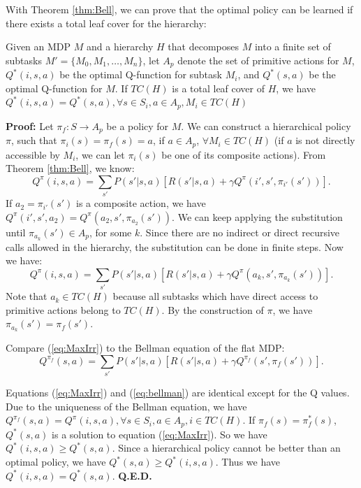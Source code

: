 With Theorem \ref{thm:Bell}, we can prove that the optimal policy can be learned if there exists a 
total leaf cover for the hierarchy:
\begin{theorem}
    Given an MDP $M$ and a hierarchy $H$ that decomposes $M$ into a finite set of subtasks $M' = \{M_0, M_1, \dots, M_n\}$,
    let $A_p$ denote the set of primitive actions for $M$, $Q^*(i, s, a)$ be the optimal Q-function for subtask $M_i$, and
    $Q^*(s, a)$ be the optimal Q-function for $M$. If $TC(H)$ is a total leaf cover of $H$,
    we have $Q^*(i, s, a) = Q^*(s, a), \forall s \in S_i, a \in A_p, M_i \in TC(H)$
    \label{thm:opt}
\end{theorem}
\textbf{Proof:} 
    Let $\pi_f: S \rightarrow A_p$ be a policy for $M$. We can construct a hierarchical policy $\pi$, such that
    $\pi_i(s) = \pi_f(s) = a$, if $a \in A_p$, $\forall M_i \in TC(H)$ (if $a$ is not directly accessible by $M_i$, we can
    let $\pi_i(s)$ be one of its composite actions).
    From Theorem \ref{thm:Bell}, we know: 
    \begin{equation}
        Q^{\pi}(i, s, a) = \sum_{s'}P(s'|s, a)[R(s'|s, a) + \gamma Q^{\pi}(i', s', \pi_{i'}(s'))].
    \end{equation}
    If $a_2= \pi_{i'}(s')$ is a composite action, we have $Q^{\pi}(i', s', a_2) = Q^{\pi}(a_2, s', \pi_{a_2}(s'))$. 
    We can keep applying the substitution until $\pi_{a_k}(s') \in A_p$, for some $k$. Since there are no
    indirect or direct recursive calls allowed in the hierarchy, the substitution can be done in finite 
    steps. Now we have:
    \begin{equation}
        Q^{\pi}(i, s, a) = \sum_{s'}P(s'|s, a)[R(s'|s, a) + \gamma Q^{\pi}(a_k, s', \pi_{a_k}(s'))].
        \label{eq:MaxIrr}
    \end{equation}
    Note that $a_k \in TC(H)$ because all subtasks which have direct access to primitive actions belong to $TC(H)$.
    By the construction of $\pi$, we have $\pi_{a_k}(s') = \pi_f(s')$.
    
    Compare (\ref{eq:MaxIrr}) to the Bellman equation of the flat MDP:
    \begin{equation}
        Q^{\pi_f}(s, a) = \sum_{s'}P(s'|s, a)[R(s'| s, a) + \gamma Q^{\pi_f}(s', \pi_f(s'))].
        \label{eq:bellman}
    \end{equation}

    Equations (\ref{eq:MaxIrr}) and (\ref{eq:bellman}) are identical except for the Q values.
    Due to the uniqueness of the Bellman equation, we have $Q^{\pi_f}(s, a) = Q^{\pi}(i, s, a), \forall s \in S_i, a \in A_p, i \in TC(H)$. 
    If $\pi_f(s) = \pi^*_f(s)$, $Q^*(s, a)$ is a solution to equation (\ref{eq:MaxIrr}). So we have $Q^*(i, s, a) \geq Q^*(s, a)$.
    Since a hierarchical policy cannot be better than an optimal policy, we have $Q^*(s, a) \geq Q^*(i, s, a)$.
    Thus we have $Q^*(i, s, a) = Q^*(s, a)$. \textbf{Q.E.D.}

